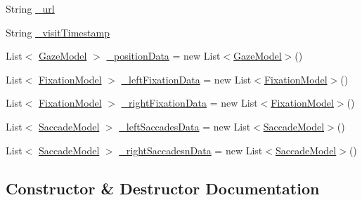 \begin{DoxyCompactItemize}
\item 
String \hyperlink{class_web_analyzer_1_1_models_1_1_data_model_1_1_webpage_model_aea93808218833baaf68514071c973ae4}{\+\_\+url}
\item 
String \hyperlink{class_web_analyzer_1_1_models_1_1_data_model_1_1_webpage_model_ac030b9fb9430a41677eb845ceabd5b26}{\+\_\+visit\+Timestamp}
\item 
List$<$ \hyperlink{class_web_analyzer_1_1_models_1_1_data_model_1_1_gaze_model}{Gaze\+Model} $>$ \hyperlink{class_web_analyzer_1_1_models_1_1_data_model_1_1_webpage_model_a1830061eb9c3046a86386306ac467f25}{\+\_\+position\+Data} = new List$<$\hyperlink{class_web_analyzer_1_1_models_1_1_data_model_1_1_gaze_model}{Gaze\+Model}$>$()
\item 
List$<$ \hyperlink{class_web_analyzer_1_1_models_1_1_analysis_model_1_1_fixation_model}{Fixation\+Model} $>$ \hyperlink{class_web_analyzer_1_1_models_1_1_data_model_1_1_webpage_model_aeef627527c26ccf4d8caa6e65101970f}{\+\_\+left\+Fixation\+Data} = new List$<$\hyperlink{class_web_analyzer_1_1_models_1_1_analysis_model_1_1_fixation_model}{Fixation\+Model}$>$()
\item 
List$<$ \hyperlink{class_web_analyzer_1_1_models_1_1_analysis_model_1_1_fixation_model}{Fixation\+Model} $>$ \hyperlink{class_web_analyzer_1_1_models_1_1_data_model_1_1_webpage_model_a5c341d7a7fd5074ddbd4cb7622914465}{\+\_\+right\+Fixation\+Data} = new List$<$\hyperlink{class_web_analyzer_1_1_models_1_1_analysis_model_1_1_fixation_model}{Fixation\+Model}$>$()
\item 
List$<$ \hyperlink{class_web_analyzer_1_1_models_1_1_analysis_model_1_1_saccade_model}{Saccade\+Model} $>$ \hyperlink{class_web_analyzer_1_1_models_1_1_data_model_1_1_webpage_model_ae5f64734db7ab52273fa0cd24ca0a31a}{\+\_\+left\+Saccades\+Data} = new List$<$\hyperlink{class_web_analyzer_1_1_models_1_1_analysis_model_1_1_saccade_model}{Saccade\+Model}$>$()
\item 
List$<$ \hyperlink{class_web_analyzer_1_1_models_1_1_analysis_model_1_1_saccade_model}{Saccade\+Model} $>$ \hyperlink{class_web_analyzer_1_1_models_1_1_data_model_1_1_webpage_model_aa2ee1cf77db6f7e7f68fbf8c971109cf}{\+\_\+right\+Saccadesn\+Data} = new List$<$\hyperlink{class_web_analyzer_1_1_models_1_1_analysis_model_1_1_saccade_model}{Saccade\+Model}$>$()
\end{DoxyCompactItemize}


\subsection{Constructor \& Destructor Documentation}
\hypertarget{class_web_analyzer_1_1_models_1_1_data_model_1_1_webpage_model_ae5054b6875654937144914f592802d9d}{}
